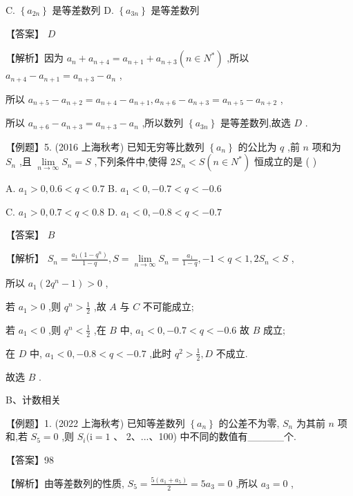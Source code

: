 \documentclass[10pt]{article}
\begin{document}
C. \(\left\{  {a}_{2n}\right\}\) 是等差数列 D. \(\left\{  {a}_{3n}\right\}\) 是等差数列

【答案】 \(D\)

【解析】因为 \({a}_{n} + {a}_{n + 4} = {a}_{n + 1} + {a}_{n + 3}\left( {n \in  {N}^{ * }}\right)\) ,所以 \({a}_{n + 4} - {a}_{n + 1} = {a}_{n + 3} - {a}_{n}\) ,

所以 \({a}_{n + 5} - {a}_{n + 2} = {a}_{n + 4} - {a}_{n + 1},{a}_{n + 6} - {a}_{n + 3} = {a}_{n + 5} - {a}_{n + 2}\) ,

所以 \({a}_{n + 6} - {a}_{n + 3} = {a}_{n + 3} - {a}_{n}\) ,所以数列 \(\left\{  {a}_{3n}\right\}\) 是等差数列,故选 \(D\) .

【例题】5. (2016 上海秋考) 已知无穷等比数列 \(\left\{  {a}_{n}\right\}\) 的公比为 \(q\) ,前 \(n\) 项和为 \({S}_{n}\) ,且 \(\mathop{\lim }\limits_{{n \rightarrow  \infty }}{S}_{n} = S\) ,下列条件中,使得 \(2{S}_{n} < S\left( {n \in  {N}^{ * }}\right)\) 恒成立的是 ( )

A. \({a}_{1} > 0,{0.6} < q < {0.7}\) B. \({a}_{1} < 0, - {0.7} < q <  - {0.6}\)

C. \({a}_{1} > 0,{0.7} < q < {0.8}\) D. \({a}_{1} < 0, - {0.8} < q <  - {0.7}\)

【答案】 \(B\)

【解析】 \({S}_{n} = \frac{{a}_{1}\left( {1 - {q}^{n}}\right) }{1 - q},S = \mathop{\lim }\limits_{{n \rightarrow  \infty }}{S}_{n} = \frac{{a}_{1}}{1 - q}, - 1 < q < 1,2{S}_{n} < S\) ,

所以 \({a}_{1}\left( {2{q}^{n} - 1}\right)  > 0\) ,

若 \({a}_{1} > 0\) ,则 \({q}^{n} > \frac{1}{2}\) ,故 \(A\) 与 \(C\) 不可能成立;

若 \({a}_{1} < 0\) ,则 \({q}^{n} < \frac{1}{2}\) ,在 \(B\) 中, \({a}_{1} < 0, - {0.7} < q <  - {0.6}\) 故 \(B\) 成立;

在 \(D\) 中, \({a}_{1} < 0, - {0.8} < q <  - {0.7}\) ,此时 \({q}^{2} > \frac{1}{2},D\) 不成立.

故选 \(B\) .

B、计数相关

【例题】1. (2022 上海秋考) 已知等差数列 \(\left\{  {a}_{n}\right\}\) 的公差不为零, \({S}_{n}\) 为其前 \(n\) 项和,若 \({S}_{5} = 0\) ,则 \({S}_{i}(\mathrm{i} = 1\) 、 2、...、100) 中不同的数值有\_\_\_\_\_个.

【答案】98

【解析】由等差数列的性质, \({S}_{5} = \frac{5\left( {{a}_{1} + {a}_{5}}\right) }{2} = 5{a}_{3} = 0\) ,所以 \({a}_{3} = 0\) ,
\end{document}

